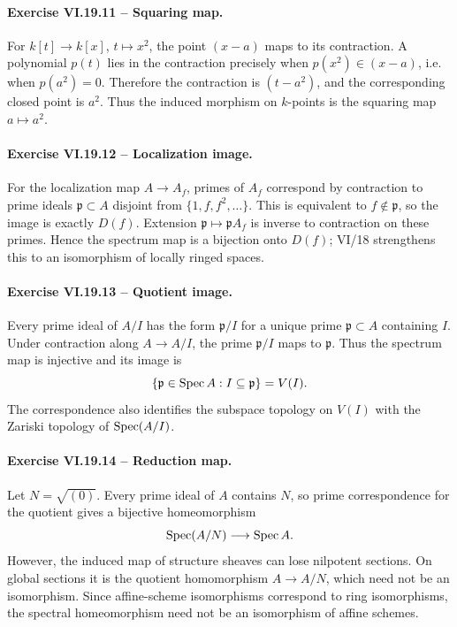 \paragraph{Exercise VI.19.11 -- Squaring map.}
\begin{solution}
For \(k[t]\to k[x]\), \(t\mapsto x^2\), the point \((x-a)\) maps to its contraction.  A polynomial \(p(t)\) lies in the contraction precisely when \(p(x^2)\in(x-a)\), i.e. when \(p(a^2)=0\).  Therefore the contraction is \((t-a^2)\), and the corresponding closed point is \(a^2\).  Thus the induced morphism on \(k\)-points is the squaring map \(a\mapsto a^2\).
\end{solution}

\paragraph{Exercise VI.19.12 -- Localization image.}
\begin{solution}
For the localization map \(A\to A_f\), primes of \(A_f\) correspond by contraction to prime ideals \(\mathfrak p\subset A\) disjoint from \(\{1,f,f^2,\ldots\}\).  This is equivalent to \(f\notin\mathfrak p\), so the image is exactly \(D(f)\).  Extension \(\mathfrak p\mapsto\mathfrak pA_f\) is inverse to contraction on these primes.  Hence the spectrum map is a bijection onto \(D(f)\); VI/18 strengthens this to an isomorphism of locally ringed spaces.
\end{solution}

\paragraph{Exercise VI.19.13 -- Quotient image.}
\begin{solution}
Every prime ideal of \(A/I\) has the form \(\mathfrak p/I\) for a unique prime \(\mathfrak p\subset A\) containing \(I\).  Under contraction along \(A\to A/I\), the prime \(\mathfrak p/I\) maps to \(\mathfrak p\).  Thus the spectrum map is injective and its image is
\[
\{\mathfrak p\in\operatorname{Spec} A:I\subseteq\mathfrak p\}=V(I).
\]
The correspondence also identifies the subspace topology on \(V(I)\) with the Zariski topology of \(\operatorname{Spec}(A/I)\).
\end{solution}

\paragraph{Exercise VI.19.14 -- Reduction map.}
\begin{solution}
Let \(N=\sqrt{(0)}\).  Every prime ideal of \(A\) contains \(N\), so prime correspondence for the quotient gives a bijective homeomorphism
\[
\operatorname{Spec}(A/N)\longrightarrow\operatorname{Spec} A.
\]
However, the induced map of structure sheaves can lose nilpotent sections.  On global sections it is the quotient homomorphism \(A\to A/N\), which need not be an isomorphism.  Since affine-scheme isomorphisms correspond to ring isomorphisms, the spectral homeomorphism need not be an isomorphism of affine schemes.
\end{solution}

